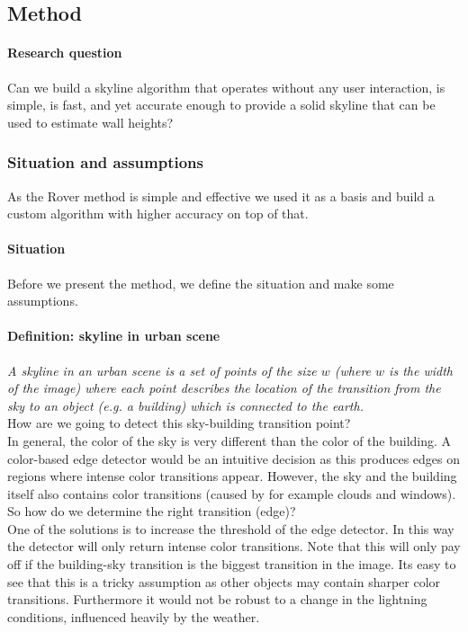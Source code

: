 \subsection{Method}
\paragraph{Research question}
Can we build a skyline algorithm that operates without any user interaction, is
simple, is fast, and yet accurate enough to provide a solid skyline that can be
used to estimate wall heights?

\subsubsection{Situation and assumptions}
As the Rover method \cite{Rover} is simple and effective we used it as a basis and 
build a custom algorithm with higher accuracy on top of that. 
\paragraph{Situation}
Before we present the method, we define the situation and make some
assumptions.\\

\paragraph{Definition: skyline in urban scene}
\emph{A skyline in an urban scene is a set of points of the size $w$ (where $w$ is the
width of the image) where each point describes the location of the
transition from the sky to an object (e.g. a building) which is connected to the
earth.}\\

How are we going to detect this sky-building transition point?\\ 
In general, the color of the sky is very different than the color of the
building. A color-based edge detector would be an intuitive decision as this
produces edges on regions where intense  color transitions appear. However, the
sky and the building itself also contains color transitions (caused by for
example clouds and windows). So how do we determine the right transition
(edge)?\\

One of the solutions is to increase the threshold of the edge detector. In this
way the detector will only return intense color transitions. Note that this will
only pay off if the building-sky transition is the biggest transition in the image. 
Its easy to see that this is a tricky assumption as other objects may contain
sharper color transitions. Furthermore it would not be robust to a change in
the lightning conditions, influenced heavily by the weather.\\

